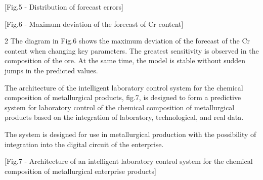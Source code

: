 [Fig.5 - Distribution of forecast errors]

[Fig.6 - Maximum deviation of the forecast of Cr content]

\begin{multicols}{2}
The diagram in Fig.6 shows the maximum deviation of the forecast of the
Cr content when changing key parameters. The greatest sensitivity is
observed in the composition of the ore. At the same time, the model is
stable without sudden jumps in the predicted values.

The architecture of the intelligent laboratory control system for the
chemical composition of metallurgical products, fig.7, is designed to
form a predictive system for laboratory control of the chemical
composition of metallurgical products based on the integration of
laboratory, technological, and real data.

The system is designed for use in metallurgical production with the
possibility of integration into the digital circuit of the enterprise.
\end{multicols}

[Fig.7 - Architecture of an intelligent laboratory control system
for the chemical composition of metallurgical enterprise products]


